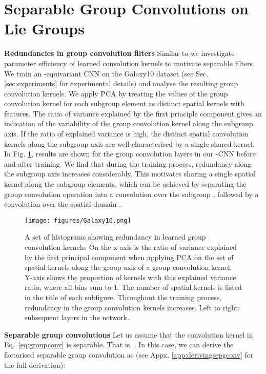 \documentclass[nohyperref]{article}
\theoremstyle{plain}
\theoremstyle{definition}
\theoremstyle{remark}
\begin{document}
\section{Separable Group Convolutions on Lie Groups} \label{sec:sep-ckgconvs}
\textbf{Redundancies in group convolution filters} Similar to \citet{haase2020rethinking,lengyel2021exploiting} we investigate parameter efficiency of learned convolution kernels to motivate separable filters. We train an -equivariant CNN on the Galaxy10 dataset (see Sec. \ref{sec:experiments} for experimental details) and analyse the resulting group convolution kernels. We apply PCA by treating the values of the group convolution kernel for each subgroup element  as distinct spatial kernels with  features. The ratio of variance explained by the first principle component gives an indication of the variability of the group convolution kernel along the subgroup axis. If the ratio of explained variance is high, the distinct spatial convolution kernels along the subgroup axis are well-characterised by a single shared kernel. In Fig. \ref{fig:redundancy}, results are shown for the group convolution layers in our -CNN before and after training. We find that during the training process, redundancy along the subgroup axis increases considerably. This motivates sharing a single spatial kernel along the subgroup elements, which can be achieved by separating the group convolution operation \break into a convolution over the subgroup , followed by a convolution over the spatial domain .
\begin{figure}
\begin{center}
\texttt{[image: figures/Galaxy10.png]}
\end{center}
\caption{A set of histograms showing redundancy in learned group convolution kernels. On the x-axis is the ratio of variance explained by the first principal component when applying PCA on the set of spatial kernels along the group axis of a group convolution kernel. Y-axis shows the proportion of kernels with this explained variance ratio, where all bins sum to 1. The number of spatial kernels is listed in the title of each subfigure. Throughout the training process, redundancy in the group convolution kernels increases. Left to right: subsequent layers in the network. \vspace{-2mm}}
\label{fig:redundancy}
\end{figure}

\textbf{Separable group convolutions} \label{sec:seperablegroupconvs} Let us assume that the convolution kernel  in Eq.~\ref{eq:groupconv} is separable. That is, .  In this case, we can derive the factorised separable group convolution as (see Appx. \ref{app:derivingsepgconv} for the full derivation):
\end{document}

